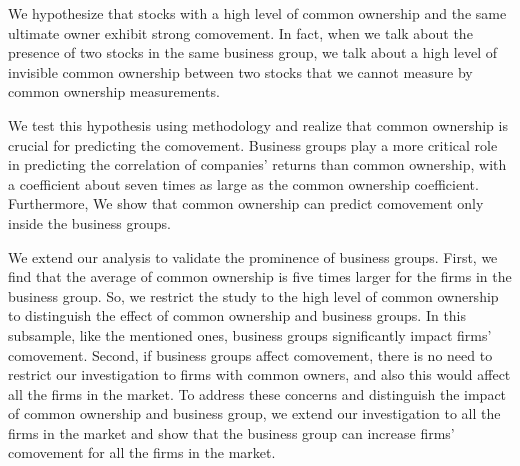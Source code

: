 

%	
%	


We hypothesize that stocks with a high level of common ownership and the same ultimate owner exhibit strong comovement. In fact, when we talk about the presence of two stocks in the same business group, we talk about a high level of invisible  common ownership between two stocks that we cannot measure by common ownership measurements. 

\reversemarginpar
We test this hypothesis using \cite{AntonPolk} methodology  and realize that common ownership is crucial for predicting the comovement. Business groups play a more critical role in predicting the correlation of companies' returns than common ownership, with a coefficient about seven times as large as the common ownership coefficient.
 Furthermore, We show that common ownership can predict comovement only inside the business groups.


We extend our analysis to validate the prominence of business groups. First, we find that the average of common ownership is five times larger for the firms in the business group. So, we restrict the study to the high level of common ownership to distinguish the effect of common ownership and business groups. In this subsample, like the mentioned ones, business groups significantly impact firms' comovement. Second, if business groups affect comovement, there is no need to restrict our investigation to firms with common owners, and also this would affect all the firms in the market. To address these concerns and distinguish the impact of common ownership and business group, we extend our investigation to all the firms in the market and show that the business group can increase firms' comovement for all the firms in the market. 
	
